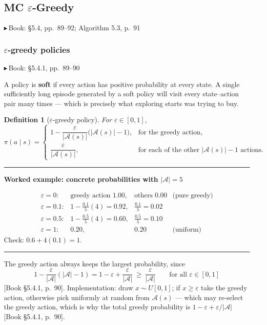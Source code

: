 \documentclass[11pt, letterpaper]{article}
\theoremstyle{runin}
\newtheorem*{definition}{Definition}
\theoremstyle{runinplain}
\theoremstyle{remark}
\newcommand{\Aspace}{\mathcal{A}}
\newcommand{\bk}[1]{{\color{bookblue}\small$\blacktriangleright$\,\textsf{Book: #1}}}
\newcommand{\bkin}[1]{{\color{bookblue}\small[\textsf{Book #1}]}}
\newenvironment{worked}[1]
  {\par\medskip\noindent\rule{\textwidth}{0.4pt}\par\nobreak\vspace{0.3em}
   \noindent\textbf{Worked example: #1}\par\nobreak\vspace{0.2em}\small}
  {\par\nobreak\vspace{0.3em}\noindent\rule{\textwidth}{0.4pt}\par\medskip}
\begin{document}
\subsection{MC $\varepsilon$-Greedy}

\bk{\S5.4, pp.~89--92; Algorithm 5.3, p.~91}

\subsubsection{$\varepsilon$-greedy policies}

\bk{\S5.4.1, pp.~89--90}

A policy is \textbf{soft} if every action has positive probability at every state.
A single sufficiently long episode generated by a soft policy will visit every
state--action pair many times --- which is precisely what exploring starts was
trying to buy.

\begin{definition}[$\varepsilon$-greedy policy]
For $\varepsilon\in[0,1]$,
\[
  \pi(a\mid s)=
  \begin{cases}
    1-\dfrac{\varepsilon}{|\Aspace(s)|}\bigl(|\Aspace(s)|-1\bigr), & \text{for the greedy action},\\[0.9em]
    \dfrac{\varepsilon}{|\Aspace(s)|}, & \text{for each of the other } |\Aspace(s)|-1 \text{ actions}.
  \end{cases}
\]
\end{definition}

\begin{worked}{concrete probabilities with $|\Aspace|=5$}
\[
\begin{array}{llll}
\varepsilon=0:   & \text{greedy action } 1.00, & \text{others } 0.00 & \text{(pure greedy)}\\
\varepsilon=0.1: & 1-\tfrac{0.1}{5}(4)=0.92,   & \tfrac{0.1}{5}=0.02 & \\
\varepsilon=0.5: & 1-\tfrac{0.5}{5}(4)=0.60,   & \tfrac{0.5}{5}=0.10 & \\
\varepsilon=1:   & 0.20,                        & 0.20                & \text{(uniform)}
\end{array}
\]
Check: $0.6+4(0.1)=1$. \checkmark
\end{worked}

The greedy action always keeps the largest probability, since
\[
  1-\frac{\varepsilon}{|\Aspace|}(|\Aspace|-1)=1-\varepsilon+\frac{\varepsilon}{|\Aspace|}
  \ \ge\ \frac{\varepsilon}{|\Aspace|}
  \qquad\text{for all }\varepsilon\in[0,1]
\]
\bkin{\S5.4.1, p.~90}. Implementation: draw $x\sim U[0,1]$; if $x\ge\varepsilon$
take the greedy action, otherwise pick uniformly at random from $\Aspace(s)$ ---
which may re-select the greedy action, which is why the total greedy probability is
$1-\varepsilon+\varepsilon/|\Aspace|$ \bkin{\S5.4.1, p.~90}.
\end{document}

